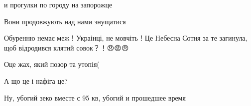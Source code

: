 \begin{itemize}
 
и прогулки по городу на запорожце

 
Вони продовжують над нами знущатися

 
Обуренню немає меж！Украінці, не мовчіть！Це Небесна Сотня за те загинула, щоб відродився клятий совок？！😠😡😠

 
Оце жах, який позор та утопія(

 
А що це і нафіга це?

 
Ну, убогий зеко вместе с 95 кв, убогий и прошедшее время

 

\end{itemize}
